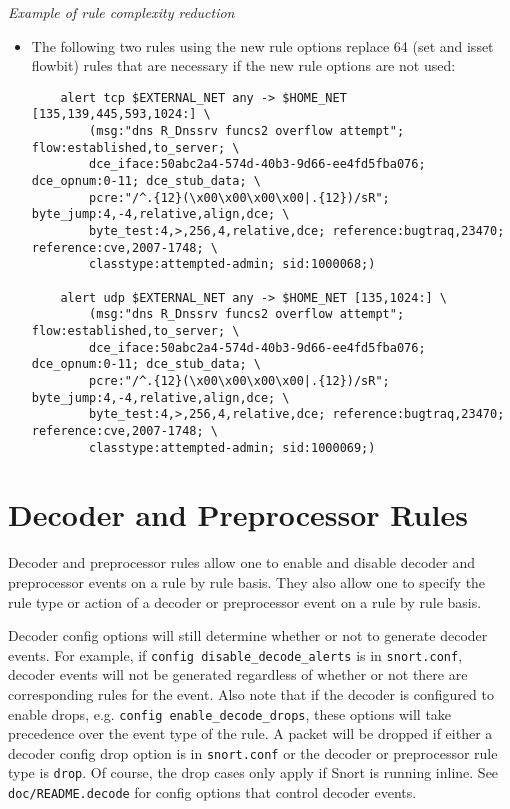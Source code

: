 \documentclass[english]{report}
\begin{document}
\textit{Example of rule complexity reduction}
\begin{itemize}

\item[] The following two rules using the new rule options replace 64 (set and
isset flowbit) rules that are necessary if the new rule options are not used:

\footnotesize
\begin{verbatim}
    alert tcp $EXTERNAL_NET any -> $HOME_NET [135,139,445,593,1024:] \
        (msg:"dns R_Dnssrv funcs2 overflow attempt"; flow:established,to_server; \
        dce_iface:50abc2a4-574d-40b3-9d66-ee4fd5fba076; dce_opnum:0-11; dce_stub_data; \
        pcre:"/^.{12}(\x00\x00\x00\x00|.{12})/sR"; byte_jump:4,-4,relative,align,dce; \
        byte_test:4,>,256,4,relative,dce; reference:bugtraq,23470; reference:cve,2007-1748; \
        classtype:attempted-admin; sid:1000068;)

    alert udp $EXTERNAL_NET any -> $HOME_NET [135,1024:] \
        (msg:"dns R_Dnssrv funcs2 overflow attempt"; flow:established,to_server; \
        dce_iface:50abc2a4-574d-40b3-9d66-ee4fd5fba076; dce_opnum:0-11; dce_stub_data; \
        pcre:"/^.{12}(\x00\x00\x00\x00|.{12})/sR"; byte_jump:4,-4,relative,align,dce; \
        byte_test:4,>,256,4,relative,dce; reference:bugtraq,23470; reference:cve,2007-1748; \
        classtype:attempted-admin; sid:1000069;)
\end{verbatim}
\normalsize
\end{itemize}


\section{Decoder and Preprocessor Rules}

Decoder and preprocessor rules allow one to enable and disable decoder and
preprocessor events on a rule by rule basis.  They also allow one to specify
the rule type or action of a decoder or preprocessor event on a rule by rule
basis.

Decoder config options will still determine whether or not to generate decoder
events.  For example, if \texttt{config disable\_decode\_alerts} is in
\texttt{snort.conf}, decoder events will not be generated regardless of whether
or not there are corresponding rules for the event.  Also note that if the
decoder is configured to enable drops, e.g. \texttt{config
enable\_decode\_drops}, these options will take precedence over the event type
of the rule.  A packet will be dropped if either a decoder config drop option
is in \texttt{snort.conf} or the decoder or preprocessor rule type is
\texttt{drop}.  Of course, the drop cases only apply if Snort is running
inline.  See \texttt{doc/README.decode} for config options that control decoder
events.
\end{document}
